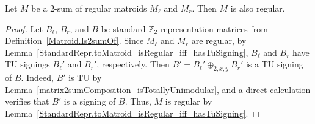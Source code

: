 \begin{theorem}
    \label{Matroid.Is2sumOf.isRegular}
    \leanok
    Let $M$ be a $2$-sum of regular matroids $M_{\ell}$ and $M_{r}$. Then $M$ is also regular.
\end{theorem}

\begin{proof}
    \leanok
    Let $B_{\ell}$, $B_{r}$, and $B$ be standard $\mathbb{Z}_{2}$ representation matrices from Definition~\ref{Matroid.Is2sumOf}. Since $M_{\ell}$ and $M_{r}$ are regular, by Lemma~\ref{StandardRepr.toMatroid_isRegular_iff_hasTuSigning}, $B_{\ell}$ and $B_{r}$ have TU signings $B_{\ell}'$ and $B_{r}'$, respectively. Then $B' = B_{\ell}' \oplus_{2, x, y} B_{r}'$ is a TU signing of $B$. Indeed, $B'$ is TU by Lemma~\ref{matrix2sumComposition_isTotallyUnimodular}, and a direct calculation verifies that $B'$ is a signing of $B$. Thus, $M$ is regular by Lemma~\ref{StandardRepr.toMatroid_isRegular_iff_hasTuSigning}.
\end{proof}
